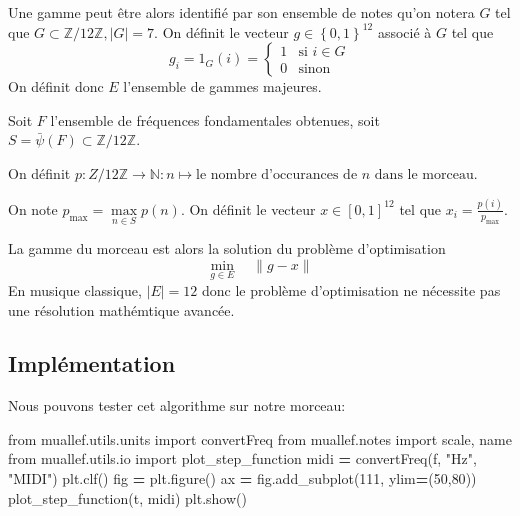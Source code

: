 \documentclass[]{article}
\newenvironment{Shaded}{\begin{snugshade}}{\end{snugshade}}
\newcommand{\DecValTok}[1]{\textcolor[rgb]{0.00,0.00,0.81}{#1}}
\newcommand{\ImportTok}[1]{#1}
\newcommand{\NormalTok}[1]{#1}
\newcommand{\OperatorTok}[1]{\textcolor[rgb]{0.81,0.36,0.00}{\textbf{#1}}}
\newcommand{\StringTok}[1]{\textcolor[rgb]{0.31,0.60,0.02}{#1}}
\begin{document}
Une gamme peut être alors identifié par son ensemble de notes qu'on
notera \(G\) tel que \(G\subset\mathbb{Z}/12\mathbb{Z}, |G|=7\). On
définit le vecteur \(g\in\left\{0,1\right\}^{12}\) associé à \(G\) tel
que \[ g_i = 1_G(i) =
\begin{cases} 1 & \text{si } i\in G\\ 0 &\text{sinon}\end{cases}\] On
définit donc \(E\) l'ensemble de gammes majeures.

Soit \(F\) l'ensemble de fréquences fondamentales obtenues, soit
\(S=\bar{\psi}(F)\subset\mathbb{Z}/12\mathbb{Z}\).

On définit
\(p:{Z}/12\mathbb{Z}\rightarrow\mathbb{N}:n\mapsto\text{le nombre d'occurances de $n$ dans le morceau}\).

On note \(p_{\max}=\max\limits_{n\in S} p(n)\). On définit le vecteur
\(x\in\left[0,1\right]^{12}\) tel que \(x_i=\frac{p(i)}{p_{\max}}\).

La gamme du morceau est alors la solution du problème d'optimisation
\[ \min\limits_{g\in E}\quad \lVert g-x \rVert \] En musique classique,
\(\lvert E\rvert = 12\) donc le problème d'optimisation ne nécessite pas
une résolution mathémtique avancée.

\hypertarget{implementation-2}{%
\subsection{Implémentation}\label{implementation-2}}

Nous pouvons tester cet algorithme sur notre morceau:

\begin{Shaded}
\begin{Highlighting}[]
\ImportTok{from}\NormalTok{ muallef.utils.units }\ImportTok{import}\NormalTok{ convertFreq}
\ImportTok{from}\NormalTok{ muallef.notes }\ImportTok{import}\NormalTok{ scale, name}
\ImportTok{from}\NormalTok{ muallef.utils.io }\ImportTok{import}\NormalTok{ plot_step_function}
\NormalTok{midi }\OperatorTok{=}\NormalTok{ convertFreq(f, }\StringTok{"Hz"}\NormalTok{, }\StringTok{"MIDI"}\NormalTok{)}
\NormalTok{plt.clf()}
\NormalTok{fig }\OperatorTok{=}\NormalTok{ plt.figure()}
\NormalTok{ax }\OperatorTok{=}\NormalTok{ fig.add_subplot(}\DecValTok{111}\NormalTok{, ylim}\OperatorTok{=}\NormalTok{(}\DecValTok{50}\NormalTok{,}\DecValTok{80}\NormalTok{))}
\NormalTok{plot_step_function(t, midi)}
\NormalTok{plt.show()}
\end{Highlighting}
\end{Shaded}
\end{document}
